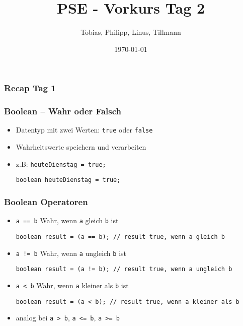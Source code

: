 \documentclass{../../presentation}
\title{PSE - Vorkurs Tag 2}
\author{Tobias, Philipp, Linus, Tillmann}
\institute{FIUS - Fachgruppe Informatik Universität Stuttgart}
\date{\today}
\begin{document}
\begin{frame}
  \titlepage
\end{frame}

\begin{frame}
  \listoftodos
\end{frame}

\begin{frame}
  \frametitle{Recap Tag 1}
\end{frame}



\begin{frame}[fragile]
  \frametitle{Boolean – Wahr oder Falsch}
  \begin{itemize}
    \item Datentyp mit zwei Werten: \texttt{true} oder \texttt{false}
    \item Wahrheitswerte speichern und verarbeiten

    \item z.B: \texttt{heuteDienstag = true;}
          \begin{verbatim}
boolean heuteDienstag = true;
    \end{verbatim}

  \end{itemize}
\end{frame}



\begin{frame}[fragile]
  \frametitle{Boolean Operatoren}


  \begin{itemize}
    \item<1->\texttt{a == b} \quad Wahr, wenn \texttt{a} gleich \texttt{b} ist
          \begin{verbatim}
boolean result = (a == b); // result true, wenn a gleich b
    \end{verbatim}

    \item<2->\texttt{a != b} \quad Wahr, wenn \texttt{a} ungleich \texttt{b} ist
          \begin{verbatim}
boolean result = (a != b); // result true, wenn a ungleich b
    \end{verbatim}

    \item<3->\texttt{a < b} \quad Wahr, wenn \texttt{a} kleiner als \texttt{b} ist
          \begin{verbatim}
boolean result = (a < b); // result true, wenn a kleiner als b
    \end{verbatim}

    \item<4->analog bei \texttt{a > b}, \texttt{a <= b}, \texttt{a >= b} \quad
  \end{itemize}
\end{frame}
\end{document}
